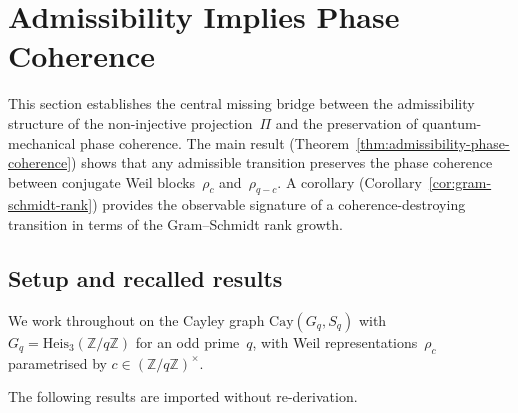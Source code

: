 
\section{Admissibility Implies Phase Coherence}
  \label{sec:admissibility-phase-coherence}

  This section establishes the central missing bridge between the admissibility
  structure of the non-injective projection~$\Pi$ and the preservation of
  quantum-mechanical phase coherence.
  The main result (Theorem~\ref{thm:admissibility-phase-coherence}) shows that
  any admissible transition preserves the phase coherence between conjugate Weil
  blocks~$\rho_c$ and~$\rho_{q-c}$.
  A corollary (Corollary~\ref{cor:gram-schmidt-rank}) provides the observable
  signature of a coherence-destroying transition in terms of the
  Gram--Schmidt rank growth.

  \subsection{Setup and recalled results}
    \label{subsec:q1-setup}

    We work throughout on the Cayley graph
    $\mathrm{Cay}(G_q, S_q)$ with $G_q = \mathrm{Heis}_3(\mathbb{Z}/q\mathbb{Z})$
    for an odd prime~$q$, with Weil representations~$\rho_c$ parametrised by
    $c \in (\mathbb{Z}/q\mathbb{Z})^\times$.

    The following results are imported without re-derivation.

